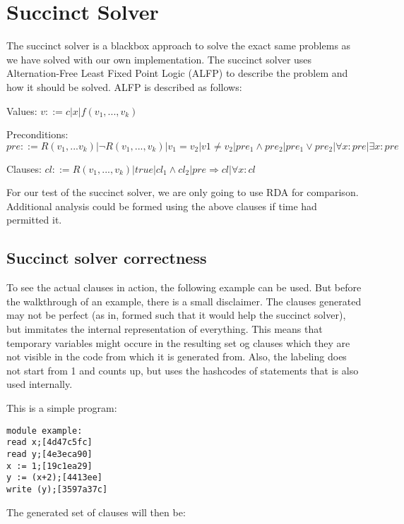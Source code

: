 \section{Succinct Solver}
The succinct solver is a blackbox approach to solve the exact same problems as we have solved with our own implementation. The succinct solver uses Alternation-Free Least Fixed Point Logic (ALFP) to describe the problem and how it should be solved. ALFP is described as follows:

Values:
$v ::= c | x | f(v_1,...,v_k)$

Preconditions:
$pre ::= R(v_1,...v_k) | \neg R(v_1,...,v_k)
      |  v_1 = v_2 | v1 \not= v_2
      |  pre_1 \wedge pre_2 | pre_1 \vee pre_2
      |  \forall x : pre | \exists x : pre$

Clauses:
$cl ::= R(v_1,...,v_k) | true | cl_1 \wedge cl_2
     |  pre \Rightarrow cl | \forall x : cl$

For our test of the succinct solver, we are only going to use RDA for comparison. Additional analysis could be formed using the above clauses if time had permitted it.

\subsection{Succinct solver correctness}
To see the actual clauses in action, the following example can be used. But before the walkthrough of an example, there is a small disclaimer. The clauses generated may not be perfect (as in, formed such that it would help the succinct solver), but immitates the internal representation of everything. This means that temporary variables might occure in the resulting set og clauses which they are not visible in the code from which it is generated from. Also, the labeling does not start from 1 and counts up, but uses the hashcodes of statements that is also used internally.

This is a simple program:
\begin{lstlisting}
module example:
read x;[4d47c5fc]
read y;[4e3eca90]
x := 1;[19c1ea29]
y := (x+2);[4413ee]
write (y);[3597a37c]
\end{lstlisting}
The generated set of clauses will then be:

